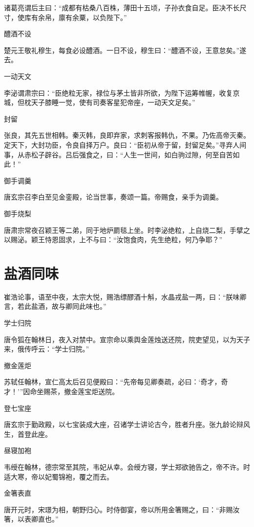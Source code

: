 \documentclass[a4paper,12pt,UTF8,twoside]{ctexbook}
\begin{document}
    诸葛亮谓后主曰：“成都有枯桑八百株，薄田十五顷，子孙衣食自足。臣决不长尺寸，使库有余帛，廪有余粟，以负陛下。”
    
    醴酒不设
    
    楚元王敬礼穆生，每食必设醴酒。一日不设，穆生曰：“醴酒不设，王意怠矣。”遂去。
    
    一动天文
    
    李泌谓肃宗曰：“臣绝粒无家，禄位与茅土皆非所欲，为陛下运筹帷幄，收复京城，但枕天子膝睡一觉，使有司奏客星犯帝座，一动天文足矣。”
    
    封留
    
    张良，其先五世相韩。秦灭韩，良即弃家，求刺客报韩仇，不果。乃佐高帝灭秦。定天下，大封功臣，令良自择万户。良曰：“臣初从帝于留，封留足矣。”寻弃人间事，从赤松子辟谷。吕后强食之，曰：“人生一世间，如白驹过隙，何至自苦如此！”
    
    御手调羹
    
    唐玄宗召李白至见金銮殿，论当世事，奏颂一篇。帝赐食，亲手为调羹。
    
    御手烧梨
    
    唐肃宗常夜召颖王等二弟，同于地炉罽毯上坐。时李泌绝粒，上自烧二梨，手擘之以赐泌。颖王恃恩固求，上不与曰：“汝饱食肉，先生绝粒，何乃争耶？”
    
    \section{盐酒同味}
    
    崔浩论事，语至中夜，太宗大悦，赐浩缥醪酒十斛，水晶戎盐一两，曰：“朕味卿言，若此盐酒，故与卿同此味也。”
    
    学士归院
    
    唐令狐在翰林日，夜入对禁中。宣宗命以乘舆金莲烛送还院，院吏望见，以为天子来，俄传呼云：“学士归院。”
    
    撤金莲炬
    
    苏轼任翰林，宣仁高太后召见便殿曰：“先帝每见卿奏疏，必曰：‘奇才，奇才！’”因命坐赐茶，撤金莲宝炬送院。
    
    登七宝座
    
    唐玄宗于勤政殿，以七宝装成大座，召诸学士讲论古今，胜者升座。张九龄论辩风生，首登此座。
    
    昼寝加袍
    
    韦绶在翰林，德宗常至其院，韦妃从幸。会绶方寝，学士郑欲驰告之，帝不许。时适大寒，帝以妃蜀锦袍，覆之而去。
    
    金箸表直
    
    唐开元时，宋璟为相，朝野归心。时侍御宴，帝以所用金箸赐之，曰：“非赐汝箸，以表卿直也。”
    
\end{document}
